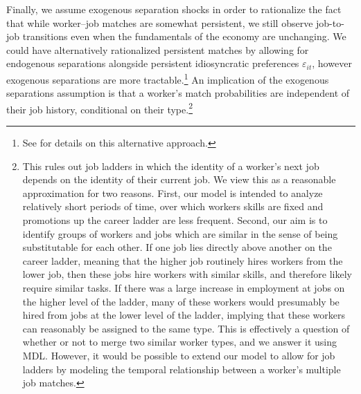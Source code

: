 \documentclass[12pt]{article}
\theoremstyle{definition}
\theoremstyle{plain}
\def\ve{\varepsilon}
\begin{document}
Finally, we assume exogenous separation shocks in order to rationalize the fact that while worker--job matches are somewhat persistent, we still observe job-to-job transitions even when the fundamentals of the economy are unchanging. We could have alternatively rationalized persistent matches by allowing for endogenous separations alongside persistent idiosyncratic preferences $\ve_{it}$, however exogenous separations are more tractable.\footnote{See \citet[ Appendix D]{Grigsby2019} for details on this alternative approach.} An implication of the exogenous separations assumption is that a worker's match probabilities are independent of their job history, conditional on their type.\footnote{This rules out job ladders in which the identity of a worker's next job depends on the identity of their current job. We view this as a reasonable approximation for two reasons. First, our model is intended to analyze relatively short periods of time, over which workers skills are fixed and promotions up the career ladder are less frequent. Second, our aim is to identify groups of workers and jobs which are similar in the sense of being substitutable for each other. If one job lies directly above another on the career ladder, meaning that the higher job routinely hires workers from the lower job, then these jobs hire workers with similar skills, and therefore likely require similar tasks. If there was a large increase in employment at jobs on the higher level of the ladder, many of these workers would presumably be hired from jobs at the lower level of the ladder, implying that these workers can reasonably be assigned to the same type. This is effectively a question of whether or not to merge two similar worker types, and we answer it using MDL.  However, it would be possible to extend our model to allow for job ladders by modeling the temporal relationship between a worker's multiple job matches.} %
\end{document}
